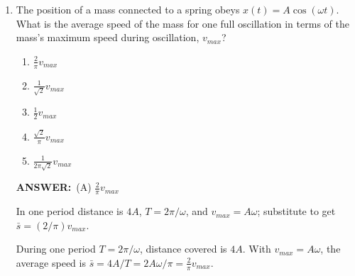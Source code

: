 \documentclass[12pt, a4paper]{article}
\makeatletter
\newcommand{\finalanswer}[1]{\textbf{ANSWER:}~#1}
\newif\if@categoryprinted
\newcommand{\category}[1]{\if@categoryprinted\relax\else\textit{\textcolor{gray}{Category: #1}}\global\@categoryprintedtrue\fi}
\makeatother
\begin{document}
\begin{CJK*}{UTF8}{gbsn}
\begin{enumerate}[itemsep=1.0em, topsep=0.6em]
\category{Statics}
\begin{answerbox}
\finalanswer{(C) Oriented at $90^\circ-\theta$ clockwise from +x}
\end{answerbox}
\begin{solutionbox}
With $|\vec F_g|=|\vec N|=|\vec F_a|$, the forces form an equilateral triangle. Geometry of components shows the applied force must be directed $90^\circ-\theta$ clockwise from +x so that the vector sum is zero.
\end{solutionbox}

\item \label{prob:24}
The position of a mass connected to a spring obeys $x(t) = A \cos(\omega t)$. What is the average speed of the mass for one full oscillation in terms of the mass’s maximum speed during oscillation, $v_{max}$?
\begin{enumerate}[label=(\Alph*)]
    \item $\frac{2}{\pi} v_{max}$
    \item $\frac{1}{\sqrt{2}} v_{max}$
    \item $\frac{1}{2} v_{max}$
    \item $\frac{\sqrt{2}}{\pi} v_{max}$
    \item $\frac{1}{2\pi\sqrt{2}} v_{max}$
\end{enumerate}

\category{Oscillations}
\begin{answerbox}
\finalanswer{(A) $\tfrac{2}{\pi}v_{max}$}
\end{answerbox}
\begin{insightbox}
In one period distance is $4A$, $T=2\pi/\omega$, and $v_{max}=A\omega$; substitute to get $\bar s=(2/\pi)v_{max}$.
\end{insightbox}
\begin{solutionbox}

During one period $T=2\pi/\omega$, distance covered is $4A$. With $v_{max}=A\omega$, the average speed is $\bar s=4A/T=2A\omega/\pi=\tfrac{2}{\pi}v_{max}$.
\end{solutionbox}

\newpage


\end{enumerate}
\end{CJK*}
\end{document}
